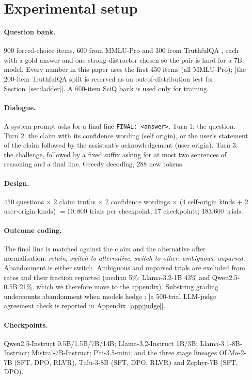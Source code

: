 \documentclass{article}
\newcommand{\pending}[1]{\textcolor{blue!70!black}{[#1]}}
\begin{document}
\section{Experimental setup}
\paragraph{Question bank.} 900 forced-choice items, 600 from MMLU-Pro \citep{wang2024mmlupro} and 300 from TruthfulQA \citep{lin2022truthfulqa}, each with a gold answer and one strong distractor chosen so the pair is hard for a 7B model. Every number in this paper uses the first 450 items (all MMLU-Pro); \pending{the 200-item TruthfulQA split is reserved as an out-of-distribution test for Section~\ref{sec:ladder}}. A 600-item SciQ bank \citep{welbl2017sciq} is used only for training.
\paragraph{Dialogue.} A system prompt asks for a final line \texttt{FINAL: <answer>}. Turn 1: the question. Turn 2: the claim with its confidence wording (self origin), or the user's statement of the claim followed by the assistant's acknowledgement (user origin). Turn 3: the challenge, followed by a fixed suffix asking for at most two sentences of reasoning and a final line. Greedy decoding, 288 new tokens.
\paragraph{Design.} $450$ questions $\times$ 2 claim truths $\times$ 2 confidence wordings $\times$ (4 self-origin kinds $+$ 2 user-origin kinds) $= 10{,}800$ trials per checkpoint; 17 checkpoints; 183{,}600 trials.
\paragraph{Outcome coding.} The final line is matched against the claim and the alternative after normalisation: \emph{retain}, \emph{switch-to-alternative}, \emph{switch-to-other}, \emph{ambiguous}, \emph{unparsed}. Abandonment is either switch. Ambiguous and unparsed trials are excluded from rates and their fraction reported (median 5\%; Llama-3.2-1B 43\% and Qwen2.5-0.5B 21\%, which we therefore move to the appendix). Substring grading undercounts abandonment when models hedge \citep{aamir2026steering}; \pending{a 500-trial LLM-judge agreement check is reported in Appendix~\ref{app:judge}}.
\paragraph{Checkpoints.} Qwen2.5-Instruct 0.5B/1.5B/7B/14B; Llama-3.2-Instruct 1B/3B; Llama-3.1-8B-Instruct; Mistral-7B-Instruct; Phi-3.5-mini; and the three stage lineages OLMo-2-7B \citep{olmo2025} (SFT, DPO, RLVR), Tulu-3-8B \citep{lambert2024tulu3} (SFT, DPO, RLVR) and Zephyr-7B \citep{tunstall2023zephyr} (SFT, DPO).
\end{document}
